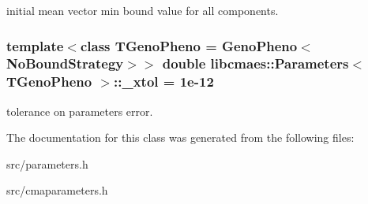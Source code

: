 initial mean vector min bound value for all components. \hypertarget{classlibcmaes_1_1Parameters_aaa9e8eedba7d7140d116163b40f653f8}{
\subsubsection[{\+\_\+xtol}]{\setlength{\rightskip}{0pt plus 5cm}template$<$class T\+Geno\+Pheno = Geno\+Pheno$<$\+No\+Bound\+Strategy$>$$>$ double {\bf libcmaes\+::\+Parameters}$<$ T\+Geno\+Pheno $>$\+::\+\_\+xtol = 1e-\/12\hspace{0.3cm}{\ttfamily [protected]}}}\label{classlibcmaes_1_1Parameters_aaa9e8eedba7d7140d116163b40f653f8}
tolerance on parameters error. 

The documentation for this class was generated from the following files\+:\begin{DoxyCompactItemize}
\item 
src/parameters.\+h\item 
src/cmaparameters.\+h\end{DoxyCompactItemize}
